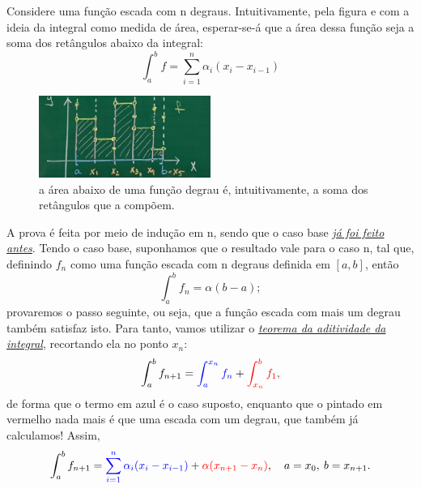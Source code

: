 \documentclass[../analysisII_notes.tex]{subfiles}
\begin{document}
\begin{example}
	Considere uma função escada com n degraus. Intuitivamente, pela figura e com a ideia da integral como medida de área, esperar-se-á que a área dessa função seja a soma dos retângulos abaixo da integral:
	\[
		\int_{a}^{b}f = \sum\limits_{i=1}^{n}\alpha_{i}(x_{i}-x_{i-1})
	\]
	\begin{figure}[H]
		\begin{center}
			\includegraphics[height=0.5\textheight, width=0.5\textwidth, keepaspectratio]{./Images/step_area_06.png}
		\end{center}
		\caption{a área abaixo de uma função degrau é, intuitivamente, a soma dos retângulos que a compõem.}
		\label{areastep06}
	\end{figure}
	A prova é feita por meio de indução em n, sendo que o caso base \hyperlink{gexample}{\textit{já foi feito antes}}. Tendo o caso base, suponhamos que o resultado vale para o caso n, tal que, definindo \(f_{n}\) como uma função escada com n degraus definida em \([a, b]\), então
	\[
		\int_{a}^{b}f_{n} = \alpha (b-a);
	\]
	provaremos o passo seguinte, ou seja, que a função escada com mais um degrau também satisfaz isto. Para tanto, vamos utilizar o \hyperlink{integral_additivity}{\textit{teorema da aditividade da integral}}, recortando ela no ponto \(x_{n}\):
	\[
		\int_{a}^{b}f_{n+1} = {\color{blue}\int_{a}^{x_{n}}f_{n}} + {\color{red}\int_{x_{n}}^{b} f_{1}},
	\]
	de forma que o termo em azul é o caso suposto, enquanto que o pintado em vermelho nada mais é que uma escada com um degrau, que também já calculamos! Assim,
	\[
		\int_{a}^{b}f_{n+1} = {\color{blue}\sum\limits_{i=1}^{n}\alpha_{i}(x_{i}-x_{i-1})} + {\color{red}\alpha(x_{n+1}-x_{n})},\quad a=x_{0},\: b=x_{n+1}.
	\]
\end{example}
\end{document}
